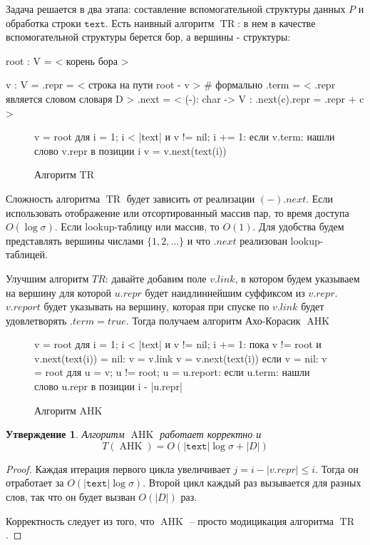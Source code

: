 \documentclass[10pt]{book}
\theoremstyle{plain}
\newtheorem{stm}{Утверждение}[section]
\newcommand{\textm}{\texttt{text}}
\newcommand{\algm}[1]{\operatorname{#1}}
\newenvironment{figurem}[1][]
  {\begin{figure}[p]
  \caption{#1}
  \centering
  }
  {
  \end{figure}
  }
\begin{document}
Задача решается в два этапа: составление вспомогательной структуры данных $P$
и обработка строки $\textm$. Есть наивный алгоритм $\algm{TR}$: в нем в
качестве вспомогательной структуры берется бор, а вершины - структуры:
\begin{verbm}
  root : V = < корень бора >
  
  v : V = {
    .repr = < строка на пути root - v >  # формально
    .term = < .repr является словом словаря D >
    .next = < (-): char -> V : .next(c).repr = .repr + c >
  }
\end{verbm}

\begin{figurem}[Алгоритм TR]
\begin{verbm}
  v = root
  для i = 1; i < |text| и v != nil; i += 1:
    если v.term: нашли слово v.repr в позиции i
    v = v.next(text(i))
\end{verbm}
\end{figurem}

Сложность алгоритма $\algm{TR}$ будет зависить от реализации $(-).next$. Если
использовать отображение или отсортированный массив пар, то время доступа
$O(\log \sigma)$. Если lookup-таблицу или массив, то $O(1)$. Для удобства будем
представлять вершины числами $\{1, 2, \ldots\}$ и что $.next$ реализован
lookup-таблицей.

Улучшим алгоритм $TR$: давайте добавим поле $v.link$, в котором
будем указываем на вершину для которой $u.repr$ будет наидлиннейшим суффиксом из
$v.repr$. $v.report$ будет указывать на вершину, которая при спуске по $v.link$
будет удовлетворять $.term = true$. Тогда получаем алгоритм Ахо-Корасик
$\algm{AHK}$

\begin{figurem}[Алгоритм AHK]
\begin{verbm}
  v = root
  для i = 1; i < |text| и v != nil; i += 1:
    пока v != root и v.next(text(i)) = nil: v = v.link
    v = v.next(text(i))
    если v = nil:
      v = root
    для u = v; u != root; u = u.report:
      если u.term:
        нашли слово u.repr в позиции i - |u.repr|
\end{verbm}
\end{figurem}

\begin{stm}
  Алгоритм $\algm{AHK}$ работает корректно и
  $$T(\algm{AHK}) = O(|\textm| \log \sigma + |D|)$$
\end{stm}
\begin{proof}
  Каждая итерация первого цикла увеличивает $j = i - |v.repr| \le i$. Тогда он
  отработает за $O(|\textm| \log \sigma)$. Второй цикл каждый раз вызывается
  для разных слов, так что он будет вызван $O(|D|)$ раз.

  Корректность следует из того, что $\algm{AHK}$ -- просто модицикация алгоритма
  $\algm{TR}$.
\end{proof}
\end{document}
